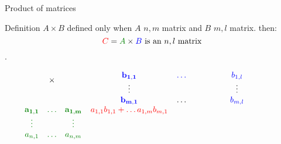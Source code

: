 \documentclass{beamer}
\begin{document}
\begin{frame}{Product of matrices}

  \begin{block}{Definition}
    \alert{$A \times B$ defined only when $A$ $n,m$ matrix and $B$ $m,l$ matrix.} then: \[{\color{red}C} = {\color{darkgreen} A} \times {\color{blue} B}\textnormal{  is an $n,l$ matrix} \].
    
    \[
    \begin{array}{cccccc}
      & \multirow{2}{*}{$\times$} & & \bf \color{blue}b_{1,1} &\color{blue} \dots & \color{blue} b_{1,l}\\
      &                           & & \bf \vdots &       & \vdots\\
      &                           & & \bf \color{blue} b_{m,1}  & \dots & \color{blue}b_{m, l}\\
      \bf \color{darkgreen}a_{1,1} &\bf \color{darkgreen} \dots & \bf \color{darkgreen}a_{1,m} & \color{red}a_{1,1}b_{1,1} + \dots a_{1,m}b_{m,1}  & \phantom{\color{red}\dots}  & \phantom{\color{red}a_{1,1}b_{1, l} + \dots + a_{1, m}b_{m, l}}\\
      \color{darkgreen}\vdots &       & \color{darkgreen}\vdots  &\phantom{\color{red}\vdots}  &  &\phantom{\color{red}\vdots} \\
      \color{darkgreen}a_{n,1} & \color{darkgreen}\dots & \color{darkgreen}a_{n, m}& \phantom{\color{red}a_{n,1}b_{1,1} + \dots a_{n,m}b_{m,1}}  & \phantom{\color{red}\dots}  & \phantom{\color{red}a_{n,1}b_{1, l} + \dots + a_{n, m}b_{m, l}}\\
    \end{array}
    \]
    
  \end{block}
  
\end{frame}
\end{document}
